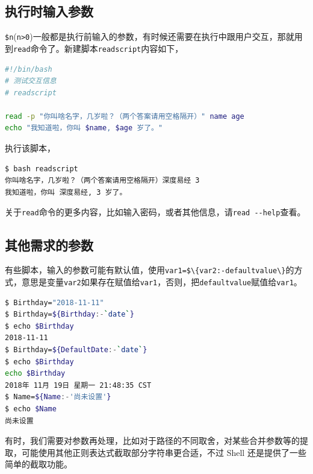 \documentclass[doctor,openright,twoside]{sjtuthesis}
\newcommand{\passthrough}[1]{#1}
\theoremstyle{plain}
\theoremstyle{definition}
\theoremstyle{remark}
\theoremstyle{ocrenumbox}
\theoremstyle{plain}
\begin{document}
\hypertarget{section-104}{%
\subsection{执行时输入参数}\label{section-104}}

\passthrough{\lstinline!$n!}(\passthrough{\lstinline!n>0!})一般都是执行前输入的参数，有时候还需要在执行中跟用户交互，那就用到\passthrough{\lstinline!read!}命令了。新建脚本\passthrough{\lstinline!readscript!}内容如下，

\begin{lstlisting}[language=bash]
#!/bin/bash
# 测试交互信息
# readscript

read -p "你叫啥名字，几岁啦？（两个答案请用空格隔开）" name age
echo "我知道啦，你叫 $name, $age 岁了。"
\end{lstlisting}

执行该脚本，

\begin{lstlisting}[language=bash]
$ bash readscript 
你叫啥名字，几岁啦？（两个答案请用空格隔开）深度易经 3
我知道啦，你叫 深度易经, 3 岁了。
\end{lstlisting}

关于\passthrough{\lstinline!read!}命令的更多内容，比如输入密码，或者其他信息，请\passthrough{\lstinline!read --help!}查看。

\hypertarget{section-105}{%
\subsection{其他需求的参数}\label{section-105}}

有些脚本，输入的参数可能有默认值，使用\passthrough{\lstinline!var1=$\{var2:-defaultvalue\}!}的方式，意思是变量\passthrough{\lstinline!var2!}如果存在赋值给\passthrough{\lstinline!var1!}，否则，把\passthrough{\lstinline!defaultvalue!}赋值给\passthrough{\lstinline!var1!}。

\begin{lstlisting}[language=bash]
$ Birthday="2018-11-11"
$ Birthday=${Birthday:-`date`}
$ echo $Birthday
2018-11-11
$ Birthday=${DefaultDate:-`date`}
$ echo $Birthday
echo $Birthday 
2018年 11月 19日 星期一 21:48:35 CST
$ Name=${Name:-'尚未设置'}
$ echo $Name
尚未设置
\end{lstlisting}

有时，我们需要对参数再处理，比如对于路径的不同取舍，对某些合并参数等的提取，可能使用其他正则表达式截取部分字符串更合适，不过 Shell 还是提供了一些简单的截取功能。
\end{document}
